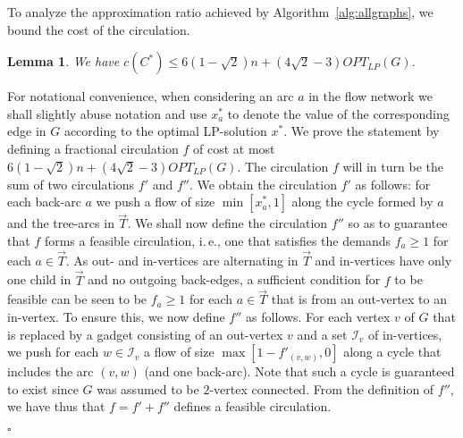 \documentclass[letterpaper,11pt]{article}
\newtheorem{lemma}[theorem]{Lemma}
\newenvironment{proof}{\begin{trivlist}
\item[\hskip\labelsep {\bf Proof}.]}{\QED \end{trivlist}}
\newcommand{\QED}{\hfill $\square$}
\newcommand{\OLP}[1]{\ensuremath{OPT_{LP}(#1)}}
\newcommand{\oa}[1]{\ensuremath{\overrightarrow{#1}}}
\begin{document}
To analyze the approximation ratio achieved by
Algorithm~\ref{alg:allgraphs}, we bound the cost of the circulation.
\begin{lemma}
\label{lemma:circcost}
  We have $c(C^*) \leq 6(1-\sqrt{2})n + (4\sqrt{2} -3)\OLP{G}$.
\end{lemma}
\begin{proof}
  For notational convenience, when considering an arc $a$ in the flow
  network we shall slightly abuse notation and use $x^*_a$ to denote
  the value of the corresponding edge in $G$ according to the optimal
  LP-solution $x^*$.
  We prove the statement by defining a fractional circulation $f$ of
  cost at most $6(1-\sqrt{2})n + (4\sqrt{2} -3)\OLP{G}$. The
  circulation $f$ will in turn be the sum of two circulations $f'$ and
  $f''$. We obtain the circulation $f'$ as follows: for each back-arc
  $a$ we push a flow of size $\min[x^*_a,1]$ along the cycle formed by
  $a$ and the tree-arcs in $\oa{T}$.  We shall now define the circulation
  $f''$ so as to guarantee that $f$ forms a feasible circulation,
  i.\,e., one that satisfies the demands $f_a \geq 1$ for each $a\in
  \oa{T}$. As out- and in-vertices are alternating in $\oa{T}$ and
  in-vertices have only one child in $\oa{T}$ and no outgoing
  back-edges, a sufficient condition for $f$ to be feasible can be
  seen to be $f_a \geq 1$ for each $a\in \oa{T}$ that is from an
  out-vertex to an in-vertex. To ensure this, we now define $f''$ as
  follows. For each vertex $v$ of $G$ that is replaced by a gadget
  consisting of an out-vertex $v$ and a set $\mathcal{I}_v$ of
  in-vertices, we push for each $w\in \mathcal{I}_v$ a flow of size
  $\max[1-f'_{(v,w)}, 0]$ along a cycle that includes the arc $(v,w)$
  (and one back-arc).
  Note that such a cycle is guaranteed to exist since $G$ was assumed to be
  $2$-vertex connected.
  From the definition of $f''$, we have thus
  that $f=f'+f''$ defines a feasible circulation.


\end{proof}
\end{document}
